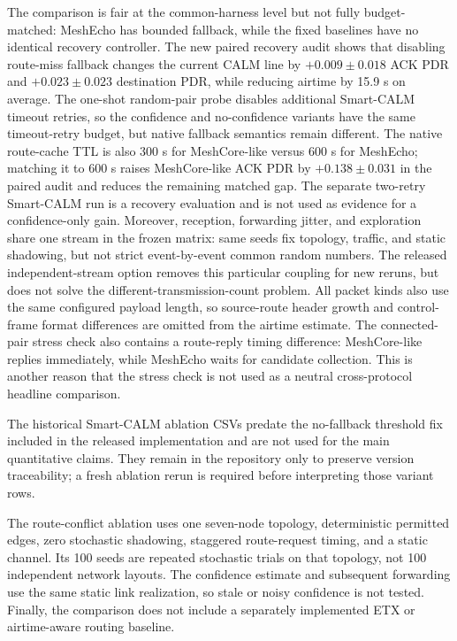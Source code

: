 \documentclass[conference]{IEEEtran}
\begin{document}
The comparison is fair at the common-harness level but not fully budget-matched:
MeshEcho has bounded fallback, while the fixed baselines have no identical
recovery controller. The new paired recovery audit shows that disabling
route-miss fallback changes the current CALM line by $+0.009\pm0.018$ ACK PDR
and $+0.023\pm0.023$ destination PDR, while reducing airtime by 15.9 s on
average. The one-shot random-pair probe disables additional
Smart-CALM timeout retries, so the confidence and no-confidence variants have
the same timeout-retry budget, but native fallback semantics remain different.
The native route-cache TTL is also 300 s for MeshCore-like versus 600 s for
MeshEcho; matching it to 600 s raises MeshCore-like ACK PDR by
$+0.138\pm0.031$ in the paired audit and reduces the remaining matched gap.
The separate two-retry Smart-CALM run is a recovery evaluation and is not used
as evidence for a confidence-only gain. Moreover, reception, forwarding
jitter, and exploration share one stream in the frozen matrix: same seeds fix
topology, traffic, and static shadowing, but not strict event-by-event common
random numbers. The released independent-stream option removes this particular
coupling for new reruns, but does not solve the different-transmission-count
problem. All packet kinds also use the same configured payload length, so
source-route header growth and control-frame format differences are omitted
from the airtime estimate. The connected-pair stress check also contains a
route-reply timing difference: MeshCore-like replies immediately, while
MeshEcho waits for candidate collection. This is another reason that the stress
check is not used as a neutral cross-protocol headline comparison.

The historical Smart-CALM ablation CSVs predate the no-fallback threshold fix
included in the released implementation and are not used for the main
quantitative claims. They remain in the repository only to preserve version
traceability; a fresh ablation rerun is required before interpreting those
variant rows.

The route-conflict ablation uses one seven-node topology, deterministic
permitted edges, zero stochastic shadowing, staggered route-request timing, and
a static channel. Its 100 seeds are repeated stochastic trials on that topology,
not 100 independent network layouts. The confidence estimate and subsequent
forwarding use the same static link realization, so stale or noisy confidence is
not tested. Finally, the comparison does not include a separately implemented
ETX or airtime-aware routing baseline.
\end{document}
